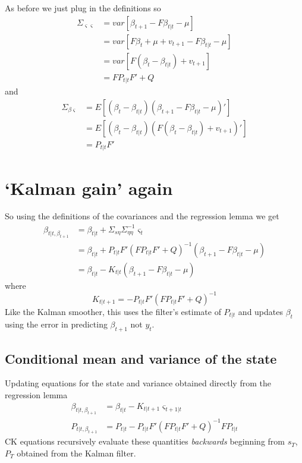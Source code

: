 \documentclass[
  letterpaper,
]{book}
\begin{document}
As before we just plug in the definitions so \begin{align}
\Sigma_{\varsigma\varsigma} &= var[\beta_{t+1}-F\beta_{t|t}-\mu] \\
&= var\left[ F\beta_t+\mu +v_{t+1}-F\beta_{t|t}-\mu \right] \\
&= var\left[ F(\beta_t-\beta_{t|t})+v_{t+1}\right] \\
&= F P_{t|t}F' + Q
\end{align} and \begin{align}
\Sigma_{\beta\varsigma} &= E\left[ (\beta_t - \beta_{t|t}) (\beta_{t+1}-F\beta_{t|t}-\mu)'\right] \\
&= E\left[ (\beta_t-\beta_{t|t})\left( F(\beta_t-\beta_{t|t})+v_{t+1}\right)'\right] \\
&= P_{t|t}F'
\end{align}

\hypertarget{kalman-gain-again}{%
\section{`Kalman gain' again}\label{kalman-gain-again}}

So using the definitions of the covariances and the regression lemma we
get \begin{align}
\beta_{t|t,\beta_{t+1}} &= \beta_{t|t} + \Sigma_{s\eta} \Sigma_{\eta\eta}^{-1}\varsigma_t \\
&= \beta_{t|t} + P_{t|t}F' \left( FP_{t|t}F' + Q\right)^{-1} (\beta_{t+1}-F\beta_{t|t}-\mu) \\
&= \beta_{t|t} - K_{t|t}(\beta_{t+1}-F\beta_{t|t}-\mu)
\end{align} where \begin{equation}
   K_{t|t+1} = - P_{t|t}F' (FP_{t|t}F' + Q)^{-1}
\end{equation} Like the Kalman smoother, this uses the filter's estimate
of \(P_{t|t}\) and updates \(\beta_t\) using the error in predicting
\(\beta_{t+1}\) not \(y_t\).

\hypertarget{conditional-mean-and-variance-of-the-state}{%
\subsection{Conditional mean and variance of the
state}\label{conditional-mean-and-variance-of-the-state}}

Updating equations for the state and variance obtained directly from the
regression lemma \begin{align}
\beta_{t|t,\beta_{t+1}} &= \beta_{t|t} - K_{t|t+1}\varsigma_{t+1|t} \\
    P_{t|t,\beta_{t+1}} &= P_{t|t}-P_{t|t}F'(FP_{t|t}F' + Q)^{-1}F P_{t|t}
\end{align} CK equations recursively evaluate these quantities
\emph{backwards} beginning from \(s_T\), \(P_T\) obtained from the
Kalman filter.
\end{document}
